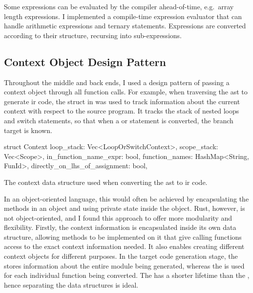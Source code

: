 \documentclass[00-main.tex]{subfiles}
\begin{document}
Some expressions can be evaluated by the compiler ahead-of-time, e.g.~array length expressions.
I implemented a compile-time expression evaluator that can handle arithmetic expressions and ternary statements.
Expressions are converted according to their structure, recursing into sub-expressions.


\subsection{Context Object Design Pattern}\label{sec:impl:context object design pattern}

Throughout the middle and back ends, I used a design pattern of passing a context object through all function calls.
For example, when traversing the \gls{ast} to generate \gls{ir} code, the  struct in  was used to track information about the current context with respect to the source program.
It tracks the stack of nested loops and switch statements, so that when a  or  statement is converted, the branch target is known.

\begin{listing}[t]
  \begin{RustListing}
    struct Context {
        loop_stack: Vec<LoopOrSwitchContext>,
        scope_stack: Vec<Scope>,
        in_function_name_expr: bool,
        function_names: HashMap<String, FunId>,
        directly_on_lhs_of_assignment: bool,
    }
  \end{RustListing}
  \caption{The context data structure used when converting the \gls{ast} to \gls{ir} code.}
  \label{lst:AST to IR context struct}
\end{listing}

In an object-oriented language, this would often be achieved by encapsulating the methods in an object and using private state inside the object.
Rust, however, is not object-oriented, and I found this approach to offer more modularity and flexibility.
Firstly, the context information is encapsulated inside its own data structure, allowing methods to be implemented on it that give calling functions access to the exact context information needed.
It also enables creating different context objects for different purposes.
In the target code generation stage, the  stores information about the entire module being generated, whereas the  is used for each individual function being converted.
The  has a shorter lifetime than the , hence separating the data structures is ideal.
\end{document}
